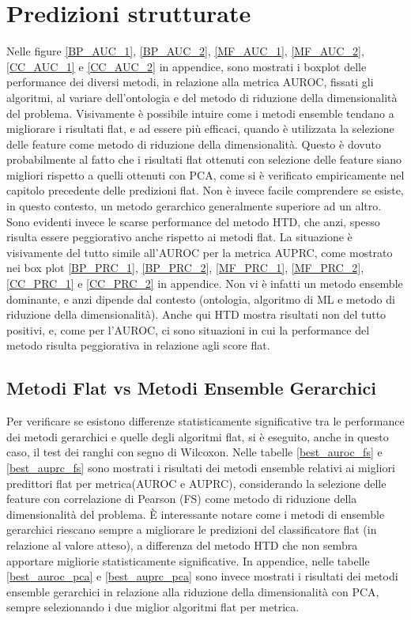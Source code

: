 \documentclass[12pt]{report}
\begin{document}
\section{Predizioni strutturate}
Nelle figure \ref{BP_AUC_1}, \ref{BP_AUC_2}, \ref{MF_AUC_1}, \ref{MF_AUC_2}, \ref{CC_AUC_1} e \ref{CC_AUC_2} in appendice, sono mostrati i boxplot delle performance dei diversi metodi, in relazione alla metrica AUROC, fissati gli algoritmi, al variare dell'ontologia e del metodo di riduzione della dimensionalità del problema. Visivamente è possibile intuire come i metodi ensemble tendano a migliorare i risultati flat, e ad essere più efficaci, quando è utilizzata la selezione delle feature come metodo di riduzione della dimensionalità. Questo è dovuto probabilmente al fatto che i risultati flat ottenuti con selezione delle feature siano migliori rispetto a quelli ottenuti con PCA, come si è verificato empiricamente nel capitolo precedente delle predizioni flat. Non è invece facile comprendere se esiste, in questo contesto, un metodo gerarchico generalmente superiore ad un altro. Sono evidenti invece le scarse performance del metodo HTD, che anzi, spesso risulta essere peggiorativo anche rispetto ai metodi flat.
\newline
\newline
La situazione è visivamente del tutto simile all'AUROC per la metrica AUPRC, come mostrato nei box plot \ref{BP_PRC_1}, \ref{BP_PRC_2}, \ref{MF_PRC_1}, \ref{MF_PRC_2}, \ref{CC_PRC_1} e \ref{CC_PRC_2} in appendice. Non vi è infatti un metodo ensemble dominante, e anzi dipende dal contesto (ontologia, algoritmo di ML e metodo di riduzione della dimensionalità). Anche qui HTD mostra risultati non del tutto positivi, e, come per l'AUROC, ci sono situazioni in cui la performance del metodo risulta peggiorativa in relazione agli score flat.  

\subsection{Metodi Flat vs Metodi Ensemble Gerarchici}
Per verificare se esistono differenze statisticamente significative tra le performance dei metodi gerarchici e quelle degli algoritmi flat, si è eseguito, anche in questo caso, il test dei ranghi con segno di Wilcoxon\cite{wilcoxon}.
\newline
\newline
Nelle tabelle  \ref{best_auroc_fs} e \ref{best_auprc_fs} sono mostrati i risultati dei metodi ensemble relativi ai migliori predittori flat per metrica(AUROC e AUPRC), considerando la selezione delle feature con correlazione di Pearson (FS) come metodo di riduzione della dimensionalità del problema. È interessante notare come i metodi di ensemble gerarchici riescano sempre a migliorare le predizioni del classificatore flat (in relazione al valore atteso), a differenza del metodo HTD che non sembra apportare migliorie statisticamente significative. In appendice, nelle tabelle \ref{best_auroc_pca} e \ref{best_auprc_pca} sono invece mostrati i risultati dei metodi ensemble gerarchici in relazione alla riduzione della dimensionalità con PCA, sempre selezionando i due miglior algoritmi flat per metrica.
\end{document}
